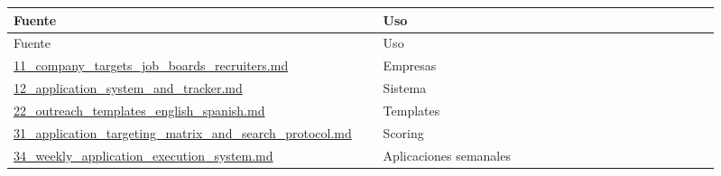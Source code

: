 \begin{center}
\scriptsize
\begin{longtable}{>{\raggedright\arraybackslash}p{0.455\linewidth} >{\raggedright\arraybackslash}p{0.455\linewidth}}
\toprule
Fuente & Uso \\
\midrule
\endfirsthead
\toprule
Fuente & Uso \\
\midrule
\endhead
\href{file:///E:/Laboral/11_company_targets_job_boards_recruiters.md}{11\_company\_targets\_job\_boards\_recruiters.md} & Empresas \\
\href{file:///E:/Laboral/12_application_system_and_tracker.md}{12\_application\_system\_and\_tracker.md} & Sistema \\
\href{file:///E:/Laboral/22_outreach_templates_english_spanish.md}{22\_outreach\_templates\_english\_spanish.md} & Templates \\
\href{file:///E:/Laboral/31_application_targeting_matrix_and_search_protocol.md}{31\_application\_targeting\_matrix\_and\_search\_protocol.md} & Scoring \\
\href{file:///E:/Laboral/34_weekly_application_execution_system.md}{34\_weekly\_application\_execution\_system.md} & Aplicaciones semanales \\
\bottomrule
\end{longtable}
\end{center}
